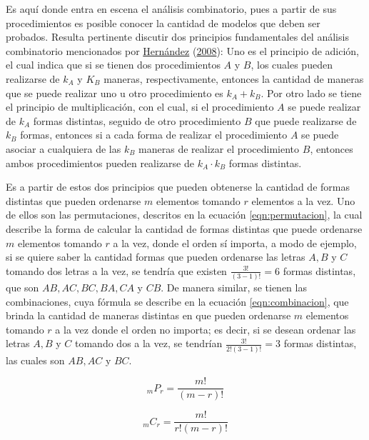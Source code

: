 \documentclass[
]{article}
\begin{document}
Es aquí donde entra en escena el análisis combinatorio, pues a partir de
sus procedimientos es posible conocer la cantidad de modelos que deben
ser probados. Resulta pertinente discutir dos principios fundamentales
del análisis combinatorio mencionados por
\protect\hyperlink{ref-analisis_combinatorio}{Hernández}
(\protect\hyperlink{ref-analisis_combinatorio}{2008}): Uno es el
principio de adición, el cual indica que si se tienen dos procedimientos
\(A\) y \(B\), los cuales pueden realizarse de \(k_A\) y \(K_B\)
maneras, respectivamente, entonces la cantidad de maneras que se puede
realizar uno u otro procedimiento es \(k_A + k_B\). Por otro lado se
tiene el principio de multiplicación, con el cual, si el procedimiento
\(A\) se puede realizar de \(k_A\) formas distintas, seguido de otro
procedimiento \(B\) que puede realizarse de \(k_B\) formas, entonces si
a cada forma de realizar el procedimiento \(A\) se puede asociar a
cualquiera de las \(k_B\) maneras de realizar el procedimiento \(B\),
entonces ambos procedimientos pueden realizarse de \(k_A \cdot k_B\)
formas distintas.

Es a partir de estos dos principios que pueden obtenerse la cantidad de
formas distintas que pueden ordenarse \(m\) elementos tomando \(r\)
elementos a la vez. Uno de ellos son las permutaciones, descritos en la
ecuación \ref{eqn:permutacion}, la cual describe la forma de calcular la
cantidad de formas distintas que puede ordenarse \(m\) elementos tomando
\(r\) a la vez, donde el orden sí importa, a modo de ejemplo, si se
quiere saber la cantidad formas que pueden ordenarse las letras \(A, B\)
y \(C\) tomando dos letras a la vez, se tendría que existen
\(\frac{3!}{(3-1)!}=6\) formas distintas, que son \(AB, AC, BC, BA, CA\)
y \(CB\). De manera similar, se tienen las combinaciones, cuya fórmula
se describe en la ecuación \ref{eqn:combinacion}, que brinda la cantidad
de maneras distintas en que pueden ordenarse \(m\) elementos tomando
\(r\) a la vez donde el orden no importa; es decir, si se desean ordenar
las letras \(A, B\) y \(C\) tomando dos a la vez, se tendrían
\(\frac{3!}{2!(3-1)!}=3\) formas distintas, las cuales son \(AB, AC\) y
\(BC\).

\begin{equation}
\label{eqn:permutacion}
_mP_r=\frac{m!}{(m-r)!}
\end{equation}

\begin{equation}
\label{eqn:combinacion}
_mC_r=\frac{m!}{r!(m-r)!}
\end{equation}
\end{document}
